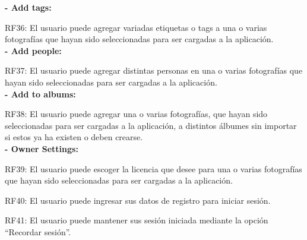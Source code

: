 \documentclass{memoria}
\begin{document}
\textbf{- Add tags:}

RF36: El usuario puede agregar variadas etiquetas o tags a una o varias fotografías que hayan sido seleccionadas para ser cargadas a la aplicación.\\

\textbf{- Add people:}

RF37: El usuario puede agregar distintas personas en una o varias fotografías que hayan sido seleccionadas para ser cargadas a la aplicación.\\

\textbf{- Add to albums:}

RF38: El usuario puede agregar una o varias fotografías, que hayan sido seleccionadas para ser cargadas a la aplicación, a distintos álbumes sin importar si estos ya ha existen o deben crearse.\\

\textbf{- Owner Settings:}

RF39: El usuario puede escoger la licencia que desee para una o varias fotografías que hayan sido seleccionadas para ser cargadas a la aplicación.\\


RF40: El usuario puede ingresar sus datos de registro para iniciar sesión.

RF41: El usuario puede mantener sus sesión iniciada mediante la opción “Recordar sesión”.\\











    
\end{document}

